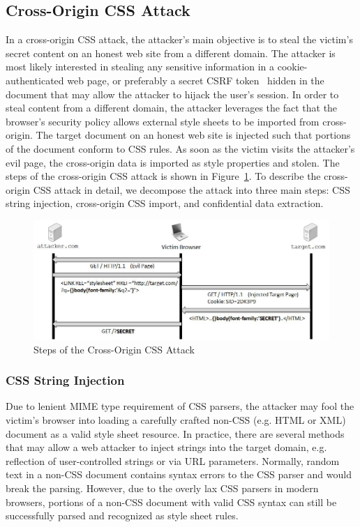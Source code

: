 \documentclass{acm_proc_article-sp}
\begin{document}
\subsection{Cross-Origin CSS Attack}
In a cross-origin CSS attack, the attacker's main objective is to steal the victim's secret content on an honest web site from a different domain. The attacker is most likely interested in stealing any sensitive information in a cookie-authenticated web page, or preferably a secret CSRF token~\cite{csrf} hidden in the document that may allow the attacker to hijack the user's session. In order to steal content from a different domain, the attacker leverages the fact that the browser's security policy allows external style sheets to be imported from cross-origin. The target document on an honest web site is injected such that portions of the document conform to CSS rules. As soon as the victim visits the attacker's evil page, the cross-origin data is imported as style properties and stolen. The steps of the cross-origin CSS attack is shown in Figure~\ref{figure:steps}. To describe the cross-origin CSS attack in detail, we decompose the attack into three main steps: CSS string injection, cross-origin CSS import, and confidential data extraction.

\begin{figure}
\centering
\includegraphics[width=\linewidth]{steps.jpg}
\caption{Steps of the Cross-Origin CSS Attack}
\label{figure:steps}
\end{figure}

\subsubsection{CSS String Injection}
Due to lenient MIME type requirement of CSS parsers, the attacker may fool the victim's browser into loading a carefully crafted non-CSS (e.g. HTML or XML) document as a valid style sheet resource. In practice, there are several methods that may allow a web attacker to inject strings into the target domain, e.g. reflection of user-controlled strings or via URL parameters. Normally, random text in a non-CSS document contains syntax errors to the CSS parser and would break the parsing. However, due to the overly lax CSS parsers in modern browsers, portions of a non-CSS document with valid CSS syntax can still be successfully parsed and recognized as style sheet rules.
\end{document}
